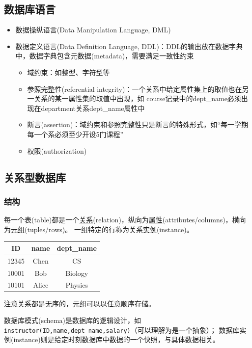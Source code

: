 \subsection{数据库语言}
\begin{itemize}
\item 数据操纵语言(Data Manipulation Language, DML)
\item 数据定义语言(Data Definition Language, DDL)：DDL的输出放在数据字典中，数据字典包含元数据(metadata)，需要满足一致性约束
\begin{itemize}
	\item 域约束：如整型、字符型等
	\item 参照完整性(referential integrity)：一个关系中给定属性集上的取值也在另一关系的某一属性集的取值中出现，如
	course记录中的dept\_name必须出现在department关系dept\_name属性中
	\item 断言(assertion)：域约束和参照完整性只是断言的特殊形式，如“每一学期每一个系必须至少开设5门课程”
	\item 权限(authorization)
\end{itemize}
\end{itemize}

\subsection{关系型数据库}
\subsubsection{结构}
每一个表(table)都是一个\underline{关系}(relation)，纵向为\underline{属性}(attributes/columns)，横向为\underline{元组}(tuples/rows)。
一组特定的行称为关系\underline{实例}(instance)。
\begin{center}
\begin{tabular}{|c|c|c|}\hline
ID & name & dept\_name\\\hline
12345 & Chen & CS\\
10001 & Bob & Biology\\
10101 & Alice & Physics\\\hline
\end{tabular}
\end{center}
注意关系都是无序的，元组可以以任意顺序存储。

数据库模式(schema)是数据库的逻辑设计，如\verb'instructor(ID,name,dept_name,salary)'（可以理解为是一个抽象）；
数据库实例(instance)则是给定时刻数据库中数据的一个快照，与具体数据相关。


